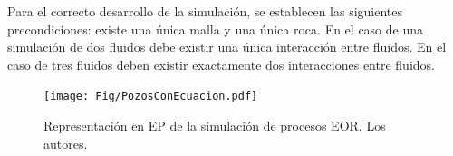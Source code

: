 Para el correcto desarrollo de la simulación, se establecen las siguientes precondiciones: existe una única malla y una única roca. En el caso de una simulación de dos fluidos debe existir una única interacción entre fluidos. En el caso de tres fluidos deben existir exactamente dos interacciones entre fluidos.


\begin{figure}[h]
\centering%
\texttt{[image: Fig/PozosConEcuacion.pdf]}%
\caption[Representación en EP de la simulación de procesos EOR.]{Representación en EP de la simulación de procesos EOR. Los autores.} \label{fig:PSComplete}
\end{figure}

